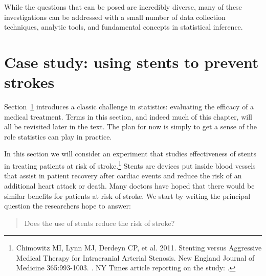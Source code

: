 While the questions that can be posed are incredibly diverse, many of these investigations can be addressed with a small number of data collection techniques, analytic tools, and fundamental concepts in statistical inference.  

   


\section[Case study]{Case study: using stents to prevent strokes}
\label{basicExampleOfStentsAndStrokes}


Section~\ref{basicExampleOfStentsAndStrokes} introduces a classic challenge in statistics: evaluating the efficacy of a medical treatment. Terms in this section, and indeed much of this chapter, will all be revisited later in the text. The plan for now is simply to get a sense of the role statistics can play in practice.

In this section we will consider an experiment that studies effectiveness of stents in treating patients at risk of stroke.\footnote{Chimowitz MI, Lynn MJ, Derdeyn CP, et al. 2011. Stenting versus Aggressive Medical Therapy for Intracranial Arterial Stenosis. New England Journal of Medicine 365:993-1003. . NY Times article reporting on the study: .} Stents are devices put inside blood vessels that assist in patient recovery after cardiac events and reduce the risk of an additional heart attack or death. Many doctors have hoped that there would be similar benefits for patients at risk of stroke. We start by writing the principal question the researchers hope to answer:
\begin{quote}
Does the use of stents reduce the risk of stroke?
\end{quote}

